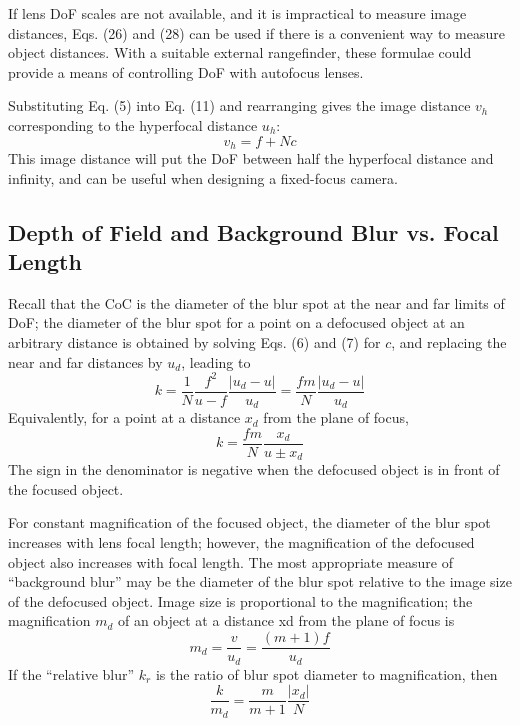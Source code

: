 \documentclass[11pt, oneside]{scrartcl}   	%
\begin{document}
If lens DoF scales are not available, and it is impractical to measure image distances, Eqs. (26) and (28) can be used if there is a convenient way to measure object distances. With a suitable external rangefinder, these formulae could provide a means of controlling DoF with autofocus lenses.

Substituting Eq. (5) into Eq. (11) and rearranging gives the image distance $v_h$ corresponding to the hyperfocal distance $u_h$:
\begin{equation}
   v_h = f + Nc
   \label{eq:vh} 
\end{equation}
This image distance will put the DoF between half the hyperfocal distance and infinity, and
can be useful when designing a fixed-focus camera.
\subsection{Depth of Field and Background Blur vs. Focal Length}

Recall that the CoC is the diameter of the blur spot at the near and far limits of DoF; the diameter of the blur spot for a point on a defocused object at an arbitrary distance is obtained by solving Eqs. (6) and (7) for $c$, and replacing the near and far distances by $u_d$, leading to
\begin{equation}
   k = \frac1N \frac{f^2}{u-f}  \frac{|u_d - u|}{u_d} = \frac{fm}N \frac{|u_d - u|}{u_d}
   \label{eq:k1}
\end{equation}
Equivalently, for a point at a distance $x_d$ from the plane of focus, 
\begin{equation}
   k = \frac{fm}N \frac{x_d}{u\pm x_d}
   \label{eq:k2}
\end{equation}
 The sign in the denominator is negative when the defocused object is in front of the focused object.

 For constant magnification of the focused object, the diameter of the blur spot increases with lens focal length; however, the magnification of the defocused object also increases with focal length. The most appropriate measure of “background blur” may be the diameter of the blur spot relative to the image size of the defocused object. Image size is proportional to the magnification; the magnification $m_d$ of an object at a distance xd from the plane of focus is
\begin{equation}
   m_d = \frac v {u_d} = \frac{(m+1)f}{u_d} 
   \label{eq:md}
\end{equation}
If the “relative blur” $k_r$ is the ratio of blur spot diameter to magnification, then
\begin{equation}
    \frac k{m_d} = \frac m{m+1}\frac{|x_d|}N
    \label{eq:km}
\end{equation}
\end{document}
